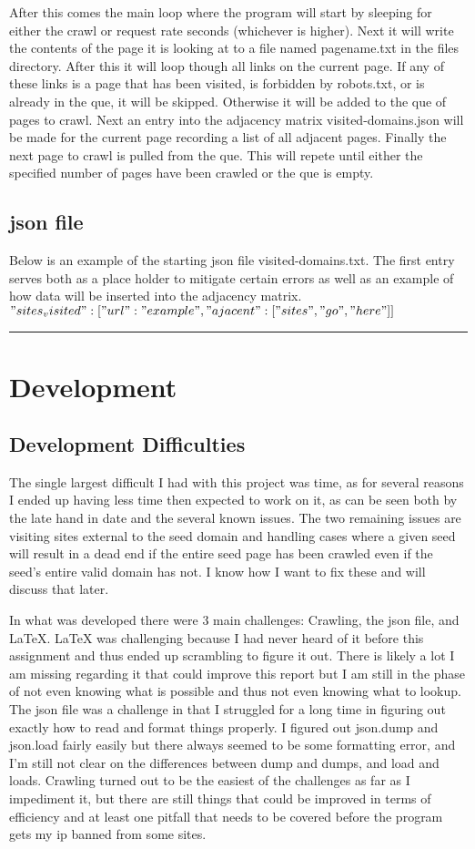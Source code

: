 \documentclass[12pt, letterpaper]{article}
\begin{document}
After this comes the main loop where the program will start by sleeping for either the crawl or request rate seconds (whichever is higher). Next it will write the contents of the page it is looking at to a file named {pagename}.txt in the files directory. After this it will loop though all links on the current page. If any of these links is a page that has been visited, is forbidden by robots.txt, or is already in the que, it will be skipped. Otherwise it will be added to the que of pages to crawl. Next an entry into the adjacency matrix visited-domains.json will be made for the current page recording a list of all adjacent pages. Finally the next page to crawl is pulled from the que. This will repete until either the specified number of pages have been crawled or the que is empty.

\subsection{json file}
Below is an example of the starting json file visited-domains.txt. The first entry serves both as a place holder to mitigate certain errors as well as an example of how data will be inserted into the adjacency matrix.
${
"sites_visited": [
{
	"url": "example",
	"ajacent": [
	"sites",
	"go",
	"here"
	]
}
]
}$

\rule{\textwidth}{0.5pt}
\section{Development}
\subsection{Development Difficulties}
The single largest difficult I had with this project was time, as for several reasons I ended up having less time then expected to work on it, as can be seen both by the late hand in date and the several known issues. The two remaining issues are visiting sites external to the seed domain and handling cases where a given seed will result in a dead end if the entire seed page has been crawled even if the seed's entire valid domain has not. I know how I want to fix these and will discuss that later. 

In what was developed there were 3 main challenges: Crawling, the json file, and LaTeX. LaTeX was challenging because I had never heard of it before this assignment and thus ended up scrambling to figure it out. There is likely a lot I am missing regarding it that could improve this report but I am still in the phase of not even knowing what is possible and thus not even knowing what to lookup. The json file was a challenge in that I struggled for a long time in figuring out exactly how to read and format things properly. I figured out json.dump and json.load fairly easily but there always seemed to be some formatting error, and I'm still not clear on the differences between dump and dumps, and load and loads. Crawling turned out to be the easiest of the challenges as far as I impediment it, but there are still things that could be improved in terms of efficiency and at least one pitfall that needs to be covered before the program gets my ip banned from some sites.
\end{document}
